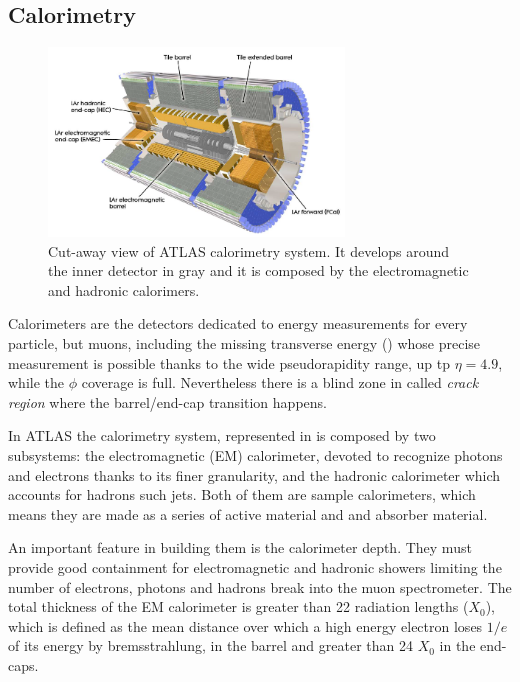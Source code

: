 \subsection{Calorimetry}
\begin{figure}[pt]
\centering
\includegraphics[width=0.7\textwidth]{LHC_ATLAS/Calorimetry}
\caption{Cut-away view of ATLAS calorimetry system. It develops around the inner detector in gray and it is composed by the electromagnetic and hadronic calorimers.}
\label{fig:Calos}
\end{figure}
\label{sec:calo}
Calorimeters are the detectors dedicated to energy measurements for every particle, but muons, including the missing transverse energy (\met) whose precise measurement is possible thanks to the wide pseudorapidity range, up tp $\eta=4.9$, while the $\phi$ coverage is full. Nevertheless there is a blind zone in  called \emph{crack region} where the barrel/end-cap transition happens.

In ATLAS the calorimetry system, represented in \Fig{\ref{fig:Calos}} is composed by two subsystems: the electromagnetic (EM) calorimeter, devoted to recognize photons and electrons thanks to its finer granularity, and the hadronic calorimeter which accounts for hadrons such jets. Both of them are sample calorimeters, which means they are made as a series of active material and and absorber material.

An important feature in building them is the calorimeter depth. They must provide good containment for electromagnetic and hadronic showers limiting the number of electrons, photons and hadrons break into the muon spectrometer. The total thickness of the EM calorimeter is greater than 22 radiation lengths ($X_0$), which is defined as the mean distance over which a high energy electron loses $1/e$ of its energy by bremsstrahlung, in the barrel and greater than 24 $X_0$ in the end-caps.


